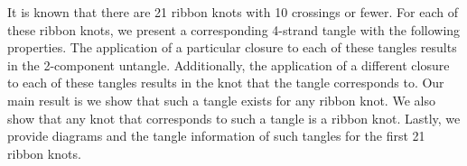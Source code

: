 
\diagrams
\theorems

\begin{paperabs}
It is known that there are 21 ribbon knots with 10 crossings or fewer.
For each of these ribbon knots, we present a corresponding 4-strand tangle with
the following properties.
The application of a particular closure to each of these tangles results in the
2-component untangle.
Additionally, the application of a different closure to each of these tangles
results in the knot that the tangle corresponds to.
Our main result is we show that such a tangle exists for any ribbon knot.
We also show that any knot that corresponds to such a tangle is a ribbon knot.
Lastly, we provide diagrams and the tangle information of such tangles for the
first 21 ribbon knots.
\end{paperabs}
